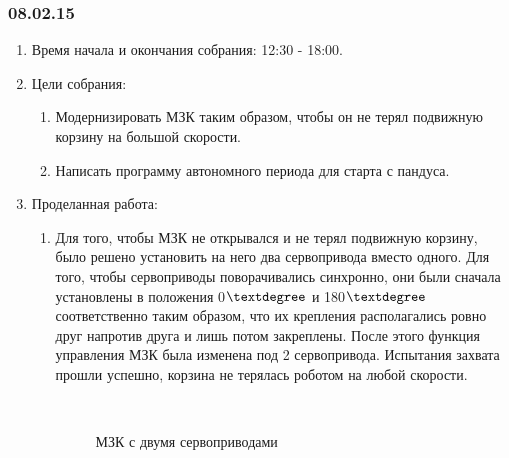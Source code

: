 \subsubsection{08.02.15}
\begin{enumerate}
	
	\item Время начала и окончания собрания: 12:30 - 18:00.
	
	\item Цели собрания: 
	\begin{enumerate}
		
		\item Модернизировать МЗК таким образом, чтобы он не терял подвижную корзину на большой скорости.
		
		\item Написать программу автономного периода для старта с пандуса.
		
	\end{enumerate}

	\item Проделанная работа:
	\begin{enumerate}
		
		\item Для того, чтобы МЗК не открывался и не терял подвижную корзину, было решено установить на него два сервопривода вместо одного. Для того, чтобы сервоприводы поворачивались синхронно, они были сначала установлены в положения 0${\textdegree}$ и 180${\textdegree}$ соответственно таким образом, что их крепления располагались ровно друг напротив друга и лишь потом закреплены. После этого функция управления МЗК была изменена под 2 сервопривода. Испытания захвата прошли успешно, корзина не терялась роботом на любой скорости.
		\begin{figure}[H]
			\begin{minipage}[h]{0.2\linewidth}
				\center  
			\end{minipage}
			\begin{minipage}[h]{0.6\linewidth}
				\caption{МЗК с двумя сервоприводами}
			\end{minipage}
		\end{figure}
		

\end{enumerate}
\end{enumerate}
